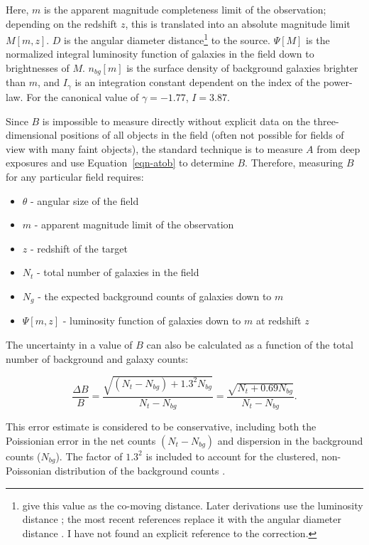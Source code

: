 \documentclass[useAMS,usenatbib]{mn2e}
\begin{document}
\noindent Here, $m$ is the apparent magnitude completeness limit of the observation; depending on the redshift $z$, this is translated into an absolute magnitude limit $M[m,z]$. $D$ is the angular diameter distance\footnote{\citet{lon79} give this value as the co-moving distance. Later derivations use the luminosity distance \citep[eg,][]{yee87,ell91}; the most recent references replace it with the angular diameter distance \citep{yee99,muz07,zau07}. I have not found an explicit reference to the correction.} to the source. $\Psi[M]$ is the normalized integral luminosity function of galaxies in the field down to brightnesses of $M$. $n_{bg}[m]$ is the surface density of background galaxies brighter than $m$, and $I_\gamma$ is an integration constant dependent on the index of the power-law. For the canonical value of $\gamma=-1.77$, $I=3.87$.  

Since $B$ is impossible to measure directly without explicit data on the three-dimensional positions of all objects in the field (often not possible for fields of view with many faint objects), the standard technique is to measure $A$ from deep exposures and use Equation~\ref{eqn-atob} to determine $B$. Therefore, measuring $B$ for any particular field requires:

\begin{itemize}
	\item $\theta$ - angular size of the field
	\item $m$ - apparent magnitude limit of the observation
	\item $z$ - redshift of the target
	\item $N_t$ - total number of galaxies in the field
	\item $N_g$ - the expected background counts of galaxies down to $m$
	\item $\Psi[m,z]$ - luminosity function of galaxies down to $m$ at redshift $z$
\end{itemize}

The uncertainty in a value of $B$ can also be calculated as a function of the total number of background and galaxy counts:

\begin{equation}
\label{eqn-deltab}
\frac{\Delta B}{B} = \frac{\sqrt{(N_t - N_{bg}) + 1.3^2 N_{bg}}}{N_t - N_{bg}} = \frac{\sqrt{N_t + 0.69 N_{bg}}}{N_t - N_{bg}}.
\end{equation}

\noindent This error estimate is considered to be conservative, including both the Poissionian error in the net counts $(N_t - N_{bg})$ and dispersion in the background counts ($N_{bg}$). The factor of $1.3^2$ is included to account for the clustered, non-Poissonian distribution of the background counts \citep{yee99}. 
\end{document}
